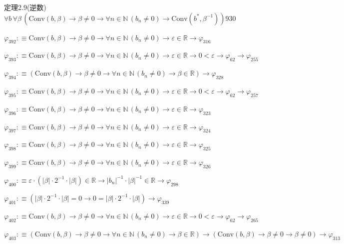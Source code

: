 \begin{fullproof}{定理2.9(逆数)}{$\forall b\,\forall \beta\,(\mathrm{Conv}(b,\beta) \to \beta \neq 0 \to \forall n \in \mathbb{N}\,(b_{n} \neq 0) \to \mathrm{Conv}(b^{\ast},\beta^{-1}))$}{930}
\begin{abbrevlist}
\item $\varphi_{392} :\equiv \mathrm{Conv}(b,\beta) \to \beta \neq 0 \to \forall n \in \mathbb{N}\,(b_{n} \neq 0) \to \varepsilon \in \mathbb{R} \to \varphi_{316}$
\item $\varphi_{393} :\equiv \mathrm{Conv}(b,\beta) \to \beta \neq 0 \to \forall n \in \mathbb{N}\,(b_{n} \neq 0) \to \varepsilon \in \mathbb{R} \to 0 < \varepsilon \to \varphi_{62} \to \varphi_{255}$
\item $\varphi_{394} :\equiv (\mathrm{Conv}(b,\beta) \to \beta \neq 0 \to \forall n \in \mathbb{N}\,(b_{n} \neq 0) \to \beta \in \mathbb{R}) \to \varphi_{328}$
\item $\varphi_{395} :\equiv \mathrm{Conv}(b,\beta) \to \beta \neq 0 \to \forall n \in \mathbb{N}\,(b_{n} \neq 0) \to \varepsilon \in \mathbb{R} \to 0 < \varepsilon \to \varphi_{62} \to \varphi_{257}$
\item $\varphi_{396} :\equiv \mathrm{Conv}(b,\beta) \to \beta \neq 0 \to \forall n \in \mathbb{N}\,(b_{n} \neq 0) \to \varepsilon \in \mathbb{R} \to \varphi_{323}$
\item $\varphi_{397} :\equiv \mathrm{Conv}(b,\beta) \to \beta \neq 0 \to \forall n \in \mathbb{N}\,(b_{n} \neq 0) \to \varepsilon \in \mathbb{R} \to \varphi_{324}$
\item $\varphi_{398} :\equiv \mathrm{Conv}(b,\beta) \to \beta \neq 0 \to \forall n \in \mathbb{N}\,(b_{n} \neq 0) \to \varepsilon \in \mathbb{R} \to \varphi_{325}$
\item $\varphi_{399} :\equiv \mathrm{Conv}(b,\beta) \to \beta \neq 0 \to \forall n \in \mathbb{N}\,(b_{n} \neq 0) \to \varepsilon \in \mathbb{R} \to \varphi_{326}$
\item $\varphi_{400} :\equiv \varepsilon \cdot (\lvert \beta \rvert \cdot 2^{-1} \cdot \lvert \beta \rvert) \in \mathbb{R} \to \lvert b_{n} \rvert^{-1} \cdot \lvert \beta \rvert^{-1} \in \mathbb{R} \to \varphi_{298}$
\item $\varphi_{401} :\equiv (\lvert \beta \rvert \cdot 2^{-1} \cdot \lvert \beta \rvert = 0 \to 0 = \lvert \beta \rvert \cdot 2^{-1} \cdot \lvert \beta \rvert) \to \varphi_{339}$
\item $\varphi_{402} :\equiv \mathrm{Conv}(b,\beta) \to \beta \neq 0 \to \forall n \in \mathbb{N}\,(b_{n} \neq 0) \to \varepsilon \in \mathbb{R} \to 0 < \varepsilon \to \varphi_{62} \to \varphi_{265}$
\item $\varphi_{403} :\equiv (\mathrm{Conv}(b,\beta) \to \beta \neq 0 \to \forall n \in \mathbb{N}\,(b_{n} \neq 0) \to \beta \in \mathbb{R}) \to (\mathrm{Conv}(b,\beta) \to \beta \neq 0 \to \beta \neq 0) \to \varphi_{313}$

\end{abbrevlist}
\end{fullproof}
